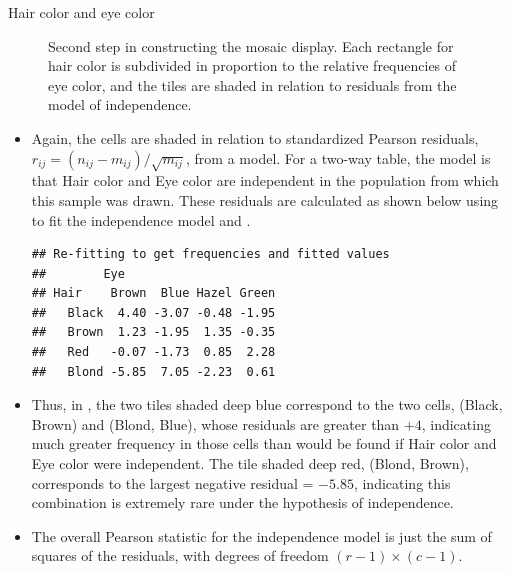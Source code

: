 \documentclass[11pt]{book}
\renewenvironment{knitrout}{\small\renewcommand{\baselinestretch}{.85}}{} %
\begin{document}
\begin{Example}[haireye2a]{Hair color and eye color}
\begin{knitrout}
\begin{figure}[!htbp]
\caption[Second step in constructing the mosaic display]{Second step in constructing the mosaic display.  Each rectangle for hair color is subdivided in proportion to the relative frequencies of eye color, and the tiles are shaded in relation to residuals from the model of independence.\label{fig:haireye-mos8}}
\end{figure}


\end{knitrout}
\begin{itemize}
\item Again, the cells are shaded in relation to standardized Pearson
residuals, \(r_{ij} = (n_{ij} - m_{ij}) / \sqrt { m_{ij} }\), 
from a model.  For a two-way table, the model is that Hair color and
Eye color are independent in the population from which this sample
was drawn.  These residuals are calculated as shown below using
 to fit the independence model and .
\begin{knitrout}
\color{fgcolor}\begin{kframe}
\begin{alltt}
 \hlkwb{<-} \hlstd{(}\hlopt{~}  \hlopt{+}  
 \hlkwb{<-}  \hlstd{=}\hlstd{),} \hlstd{)}
\end{alltt}
\begin{verbatim}
## Re-fitting to get frequencies and fitted values
##        Eye
## Hair    Brown  Blue Hazel Green
##   Black  4.40 -3.07 -0.48 -1.95
##   Brown  1.23 -1.95  1.35 -0.35
##   Red   -0.07 -1.73  0.85  2.28
##   Blond -5.85  7.05 -2.23  0.61
\end{verbatim}
\end{kframe}
\end{knitrout}
\item Thus, in , 
the two tiles shaded deep blue correspond to the two
cells, (Black, Brown) and (Blond, Blue), whose residuals are
greater than $+4$, indicating much greater frequency in those
cells than would be found if Hair color and Eye color were
independent.
The tile shaded deep red, (Blond, Brown),
corresponds to the largest negative residual = $-5.85$, indicating this combination
is extremely rare under the hypothesis of independence.
\item The overall Pearson \chisq{} statistic for the independence model
is just the
sum of squares of the residuals, with degrees of freedom $(r-1) \times (c-1)$.

\end{itemize}
\end{Example}
\end{document}
